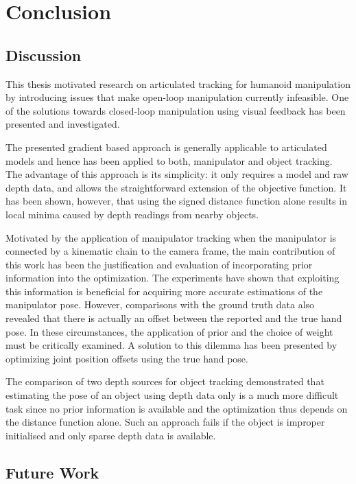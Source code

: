 \chapter{Conclusion}
\label{sec:conclusion}

\section{Discussion}

This thesis motivated research on articulated tracking for humanoid manipulation by introducing issues that make open-loop manipulation currently infeasible. One of the solutions towards closed-loop manipulation using visual feedback has been presented and investigated.

The presented gradient based approach is generally applicable to articulated models and hence has been applied to both, manipulator and object tracking. The advantage of this approach is its simplicity: it only requires a model and raw depth data, and allows the straightforward extension of the objective function.
It has been shown, however, that using the signed distance function alone results in local minima caused by depth readings from nearby objects.

Motivated by the application of manipulator tracking when the manipulator is connected by a kinematic chain to the camera frame, the main contribution of this work has been the justification and evaluation of incorporating prior information into the optimization.
The experiments have shown that exploiting this information is beneficial for acquiring more accurate estimations of the manipulator pose.
However, comparisons with the ground truth data also revealed that there is actually an offset between the reported and the true hand pose. In these circumstances, the application of prior and the choice of weight must be critically examined. A solution to this dilemma has been presented by optimizing joint position offsets using the true hand pose.

The comparison of two depth sources for object tracking demonstrated that estimating the pose of an object using depth data only is a much more difficult task since no prior information is available and the optimization thus depends on the distance function alone. Such an approach fails if the object is improper initialised and only sparse depth data is available.


\section{Future Work}

